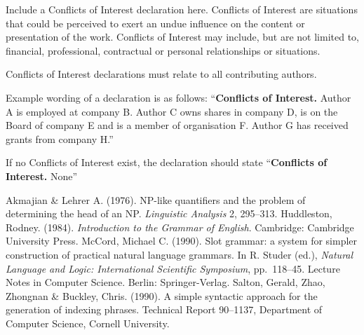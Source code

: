 \documentclass{jfp}
\begin{document}
Include a Conflicts of Interest declaration here.
Conflicts of Interest are situations that could be perceived to exert an undue influence on the content or presentation of the work. Conflicts of Interest may include, but are not limited to, financial, professional, contractual or personal relationships or situations.

\noindent Conflicts of Interest declarations must relate to all contributing authors.

\noindent Example wording of a declaration is as follows: ``\textbf{Conflicts of Interest.} Author A is employed at company B. Author C owns shares in company D, is on the Board of company E and is a member of organisation F. Author G has received grants from company H.''

\noindent If no Conflicts of Interest exist, the declaration should state ``\textbf{Conflicts of Interest.} None''

\begin{thebibliography}{}
   Akmajian \& Lehrer A. (1976). NP-like quantifiers and the
   problem of determining the head of an NP. {\it Linguistic
   Analysis\/} {2}, 295--313.
   Huddleston, Rodney. (1984). {\it Introduction to the Grammar of
   English}. Cambridge: Cambridge University Press.
   McCord, Michael C. (1990). Slot grammar: a system for simpler
   construction of practical natural language grammars. In R.
   Studer (ed.), {\it Natural Language and Logic: International
   Scientific Symposium}, pp.~118--45. Lecture Notes in Computer
   Science. Berlin: Springer-Verlag.
   Salton, Gerald, Zhao, Zhongnan \& Buckley, Chris. (1990).
   A simple syntactic approach for the generation of indexing
   phrases. Technical Report 90--1137, Department of Computer
   Science, Cornell University.
\end{thebibliography}

\label{lastpage01}
\end{document}
